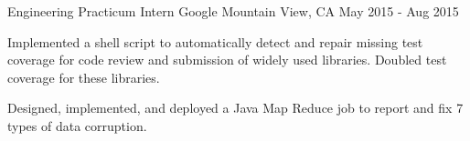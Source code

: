 \begin{cventries}
  \cventry
    {Engineering Practicum Intern} %
    {Google} %
    {Mountain View, CA} %
    {May 2015 - Aug 2015} %
    {
      \begin{cvitems} %
        \item {Implemented a shell script to automatically detect and repair missing test coverage for code review and submission of widely used libraries. Doubled test coverage for these libraries.}
        \item {Designed, implemented, and deployed a Java Map Reduce job to report and fix 7 types of data corruption.}
      \end{cvitems}
    }




\end{cventries}
